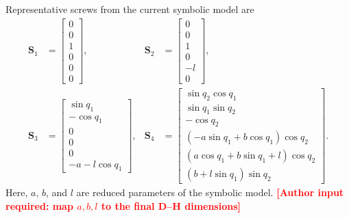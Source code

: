 \documentclass[a4paper,fleqn]{cas-sc}
\newcommand{\missing}[1]{\textcolor{red}{\textbf{[#1]}}}
\begin{document}
Representative screws from the current symbolic model are
\begin{equation}
\begin{aligned}
\mathbf S_1&=\begin{bmatrix}0\\0\\1\\0\\0\\0\end{bmatrix},&
\mathbf S_2&=\begin{bmatrix}0\\0\\1\\0\\-l\\0\end{bmatrix},\\
\mathbf S_3&=\begin{bmatrix}
\sin q_1\\-\cos q_1\\0\\0\\0\\-a-l\cos q_1
\end{bmatrix},&
\mathbf S_4&=\begin{bmatrix}
\sin q_2\cos q_1\\
\sin q_1\sin q_2\\
-\cos q_2\\
(-a\sin q_1+b\cos q_1)\cos q_2\\
(a\cos q_1+b\sin q_1+l)\cos q_2\\
(b+l\sin q_1)\sin q_2
\end{bmatrix}.
\end{aligned}
\label{eq:representative_screws}
\end{equation}
Here, \(a\), \(b\), and \(l\) are reduced parameters of the symbolic model.
\missing{Author input required: map \(a,b,l\) to the final D--H dimensions}
\end{document}
